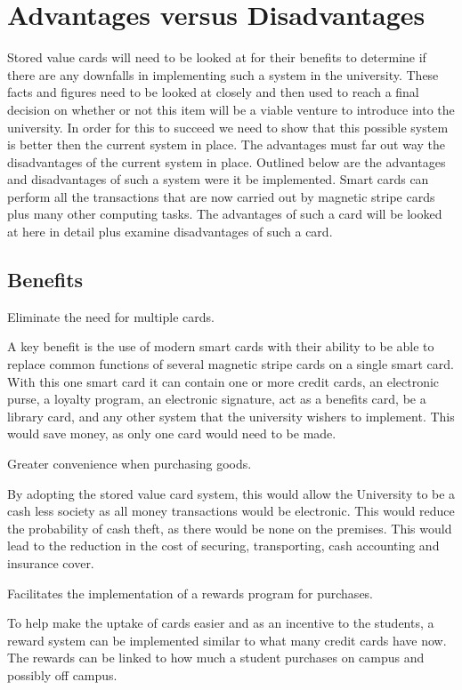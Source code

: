 \section{Advantages versus Disadvantages}

Stored value cards will need to be looked at for their benefits to determine if
there are any downfalls in implementing such a system in the university. These
facts and figures need to be looked at closely and then used to reach a final
decision on whether or not this item will be a viable venture to introduce
into the university. In order for this to succeed we need to show that this
possible system is better then the current system in place. The advantages must
far out way the disadvantages of the current system in place. Outlined below
are the advantages and disadvantages of such a system were it be implemented.
Smart cards can perform all the transactions that are now carried out by
magnetic stripe cards plus many other computing tasks. The advantages of such
a card will be looked at here in detail plus examine disadvantages of such a
card.  

\subsection{Benefits}

\items Eliminate the need for multiple cards.

A key benefit is the use of modern smart cards with their ability to be able to
replace common functions of several magnetic stripe cards on a single smart
card.  With this one smart card it can contain one or more credit cards, an
electronic purse, a loyalty program, an electronic signature, act as a benefits
card, be a library card, and any other system that the university wishers to
implement. This would save money, as only one card would need to be made.
\cite{noonan}

\items Greater convenience when purchasing goods.

By adopting the stored value card system, this would allow the University to be
a cash less society as all money transactions would be electronic. This would
reduce the probability of cash theft, as there would be none on the premises.
This would lead to the reduction in the cost of securing, transporting, cash
accounting and insurance cover. \cite{fms}

\items Facilitates the implementation of a rewards program for purchases.

To help make the uptake of cards easier and as an incentive to the students, a
reward system can be implemented similar to what many credit cards have now.
The rewards can be linked to how much a student purchases on campus and
possibly off campus. 

